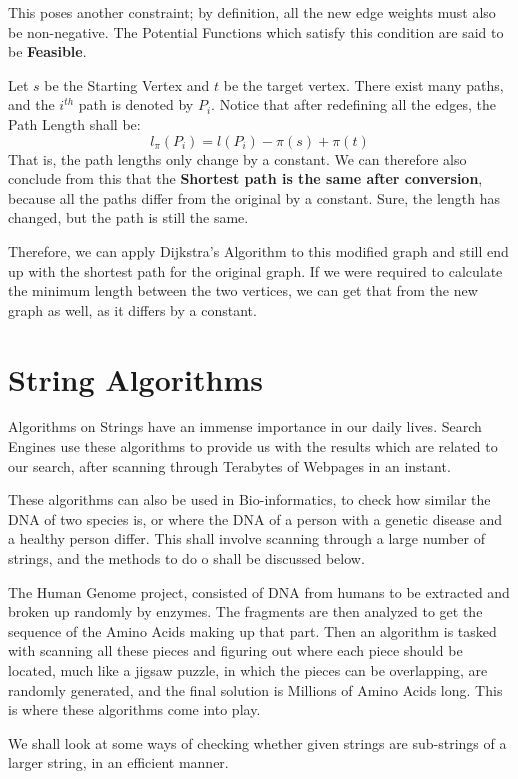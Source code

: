 \documentclass{article}
\theoremstyle{definition}
\theoremstyle{example}
\begin{document}
This poses another constraint; by definition, all the new edge weights must also be non-negative. The Potential Functions which satisfy this condition are said to be \textbf{Feasible}.\par
\vspace{4mm}
Let $s$ be the Starting Vertex and $t$ be the target vertex. There exist many paths, and the $i^{th}$ path is denoted by $P_i$. Notice that after redefining all the edges, the Path Length shall be:
\[l_{\pi}(P_i) = l(P_i) - \pi(s) + \pi(t)\]
That is, the path lengths only change by a constant. We can therefore also conclude from this that the \textbf{Shortest path is the same after conversion}, because all the paths differ from the original by a constant. Sure, the length has changed, but the path is still the same.\par
\vspace{4mm}
Therefore, we can apply Dijkstra's Algorithm to this modified graph and still end up with the shortest path for the original graph. If we were required to calculate the minimum length between the two vertices, we can get that from the new graph as well, as it differs by a constant.
\newpage

\section{\Large String Algorithms}
\hspace{4mm} Algorithms on Strings have an immense importance in our daily lives. Search Engines use these algorithms to provide us with the results which are related to our search, after scanning through Terabytes of Webpages in an instant.\par
\vspace{4mm}
These algorithms can also be used in Bio-informatics, to check how similar the DNA of two species is, or where the DNA of a person with a genetic disease and a healthy person differ. This shall involve scanning through a large number of strings, and the methods to do o shall be discussed below.\par
\vspace{4mm}
The Human Genome project, consisted of DNA from humans to be extracted and broken up randomly by enzymes. The fragments are then analyzed to get the sequence of the Amino Acids making up that part. Then an algorithm is tasked with scanning all these pieces and figuring out where each piece should be located, much like a jigsaw puzzle, in which the pieces can be overlapping, are randomly generated, and the final solution is Millions of Amino Acids long. This is where these algorithms come into play.\par
\vspace{4mm}
We shall look at some ways of checking whether given strings are sub-strings of a larger string, in an efficient manner.
\end{document}
